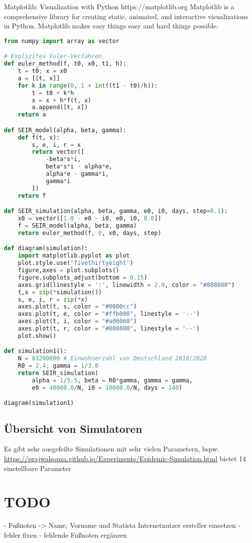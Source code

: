 \documentclass[12pt]{article}
\begin{document}
Matplotlib: Visualization with Python https://matplotlib.org
Matplotlib is a comprehensive library for creating static, animated, and interactive visualizations in Python. Matplotlib makes easy things easy and hard things possible.




\begin{lstlisting}[language=Python]
from numpy import array as vector

# Explizites Euler-Verfahren
def euler_method(f, t0, x0, t1, h):
    t = t0; x = x0
    a = [[t, x]]
    for k in range(0, 1 + int((t1 - t0)/h)):
        t = t0 + k*h
        x = x + h*f(t, x)
        a.append([t, x])
    return a

def SEIR_model(alpha, beta, gamma):
    def f(t, x):
        s, e, i, r = x
        return vector([
            -beta*s*i,
            beta*s*i - alpha*e,
            alpha*e - gamma*i,
            gamma*i
        ])
    return f

def SEIR_simulation(alpha, beta, gamma, e0, i0, days, step=0.1):
    x0 = vector([1.0 - e0 - i0, e0, i0, 0.0])
    f = SEIR_model(alpha, beta, gamma)
    return euler_method(f, 0, x0, days, step)

def diagram(simulation):
    import matplotlib.pyplot as plot
    plot.style.use('fivethirtyeight')
    figure,axes = plot.subplots()
    figure.subplots_adjust(bottom = 0.15)
    axes.grid(linestyle = ':', linewidth = 2.0, color = "#808080")
    t,x = zip(*simulation())
    s, e, i, r = zip(*x)
    axes.plot(t, s, color = "#0000cc")
    axes.plot(t, e, color = "#ffb000", linestyle = '--')
    axes.plot(t, i, color = "#a00060")
    axes.plot(t, r, color = "#008000", linestyle = '--')
    plot.show()

def simulation1():
    N = 83200000 # Einwohnerzahl von Deutschland 2019/2020
    R0 = 2.4; gamma = 1/3.0
    return SEIR_simulation(
        alpha = 1/5.5, beta = R0*gamma, gamma = gamma,
        e0 = 40000.0/N, i0 = 10000.0/N, days = 140)

diagram(simulation1)
\end{lstlisting}


\subsection{Übersicht von Simulatoren}

Es gibt sehr ausgefeilte Simulationen mit sehr vielen Parametern, bspw. \url{https://prajwalsouza.github.io/Experiments/Epidemic-Simulation.html} bietet 14 einstellbare Parameter


\section{TODO}
- Fußnoten -> Name, Vorname und Statista Internetnutzer ersteller einsetzen
- fehler fixen
- fehlende Fußnoten ergänzen

\newpage
\printbibliography
\end{document}
